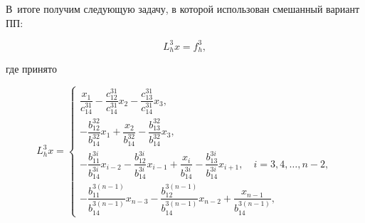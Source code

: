 В~итоге получим следующую задачу, в которой использован смешанный вариант ПП:

\begin{equation}

\label{mc:eq17}

   L_{h}^3x=f_{h}^3,

\end{equation}

где принято

\begin{equation}

\label{mc:eq19}

   L_{h}^3x

=\begin{cases}

\dfrac{x_1}{c_{14}^{31}}-\dfrac{c_{12}^{31}}{c_{14}^{31}} x_{2}-

\dfrac{c_{13}^{31}}{c_{14}^{31}} x_{3},

\\[3mm]

-\dfrac{b_{12}^{32}}{b_{14}^{32}} x_{1}

+\dfrac{x_2}{b_{14}^{32}}

-\dfrac{b_{13}^{32}}{b_{14}^{32}} x_{3},

\\[3mm]

-\dfrac{b_{11}^{3i}}{b_{14}^{3i}} x_{i-2}

-\dfrac{b_{12}^{3i}}{b_{14}^{3i}} x_{i-1}

+\dfrac{x_i}{b_{14}^{3i}}

-\dfrac{b_{13}^{3i}}{b_{14}^{3i}} x_{i+1},\quad  i=3,  4,  \dots,  n-2,

\\[3mm]

-\dfrac{b_{11}^{3(n-1)}}{b_{14}^{3(n-1)}} x_{n-3}

-\dfrac{b_{12}^{3(n-1)}}{b_{14}^{3(n-1)}} x_{n-2}

+\dfrac{x_{n-1}}{b_{14}^{3(n-1)}},

\end{cases}

\end{equation}

